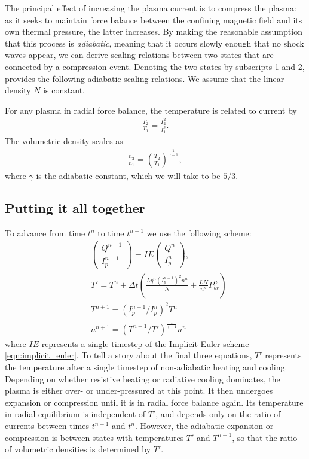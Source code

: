 \documentclass{article}
\begin{document}
The principal effect of increasing the plasma current is to compress the plasma: as it seeks
to maintain force balance between the confining magnetic field and its own thermal pressure,
the latter increases.
By making the reasonable assumption that this process is \emph{adiabatic}, meaning that
it occurs slowly enough that no shock waves appear, we can derive scaling relations between
two states that are connected by a compression event.
Denoting the two states by subscripts 1 and 2, \cite{shumlakShearedFlowStabilizedZPinch2012}
provides the following adiabatic scaling relations.
We assume that the linear density $N$ is constant.

For any plasma in radial force balance, the temperature is related to current by
\begin{align*}
\frac{T_2}{T_1} = \frac{I_2^2}{I_1^2}.
\end{align*}
The volumetric density scales as
\begin{align*}
    \frac{n_2}{n_1} = \left( \frac{T_2}{T_1} \right)^{\frac{1}{\gamma-1}},
\end{align*}
where $\gamma$ is the adiabatic constant, which we will take to be $5/3$.

\subsection{Putting it all together}

To advance from time $t^n$ to time $t^{n+1}$ we use the following scheme:
\begin{align*}
    &\begin{pmatrix}
        Q^{n+1} \\
        I_p^{n+1}
    \end{pmatrix} = IE \begin{pmatrix}
    Q^n \\ I_p^n
    \end{pmatrix}, \\
    &T' = T^n + \Delta t \left( \frac{L \eta^{n} (I_p^{n+1})^2 n^n}{N} + \frac{LN}{n^n}P_{br}^n \right) \\
    &T^{n+1} = (I_p^{n+1}/I_p^n)^2 T^n \\
    &n^{n+1} = (T^{n+1} / T')^{\frac{1}{\gamma-1}} n^n
\end{align*}
where $IE$ represents a single timestep of the Implicit Euler scheme \eqref{eqn:implicit_euler}.
To tell a story about the final three equations, $T'$ represents the temperature after
a single timestep of non-adiabatic heating and cooling.
Depending on whether resistive heating or radiative cooling dominates, the plasma is either over- or under-pressured
at this point.
It then undergoes expansion or compression until it is in radial force balance again.
Its temperature in radial equilibrium is independent of $T'$, and depends only on the ratio of currents
between times $t^{n+1}$ and $t^n$.
However, the adiabatic expansion or compression is between states with temperatures $T'$ and $T^{n+1}$,
so that the ratio of volumetric densities is determined by $T'$.
\end{document}

